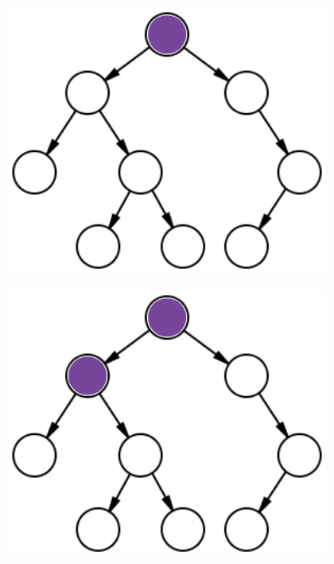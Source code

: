 \documentclass{beamer}
\begin{document}
\begin{frame}[fragile]
  \centering
  \begin{figure}
    \includegraphics[width=0.75\textwidth]{binary-tree-filled-1}
  \end{figure}
\end{frame}

\begin{frame}[fragile]
  \centering
  \begin{figure}
    \includegraphics[width=0.75\textwidth]{binary-tree-filled-2}
  \end{figure}
\end{frame}
\end{document}
